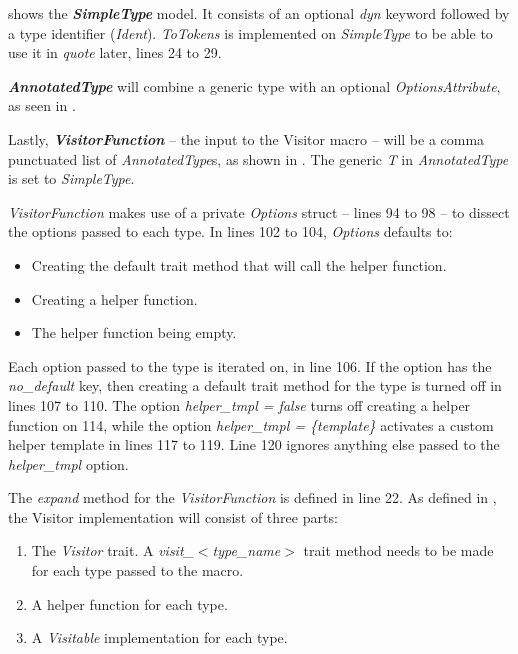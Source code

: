  shows the \textbf{\textit{SimpleType}} model.
It consists of an optional \textit{dyn} keyword followed by a type identifier (\textit{Ident}).
\textit{ToTokens} is implemented on \textit{SimpleType} to be able to use it in \textit{quote} later, lines 24 to 29.

\textbf{\textit{AnnotatedType}} will combine a generic type with an optional \textit{OptionsAttribute}, as seen in .


Lastly, \textbf{\textit{VisitorFunction}} -- the input to the Visitor macro -- will be a comma punctuated list of \textit{AnnotatedType}s, as shown in .
The generic \textit{T} in \textit{AnnotatedType} is set to \textit{SimpleType}.

\textit{VisitorFunction} makes use of a private \textit{Options} struct -- lines 94 to 98 -- to dissect the options passed to each type.
In lines 102 to 104, \textit{Options} defaults to:

\begin{itemize}
	\item Creating the default trait method that will call the helper function.
	\item Creating a helper function.
	\item The helper function being empty.
\end{itemize}

Each option passed to the type is iterated on, in line 106.
If the option has the \textit{no\_default} key, then creating a default trait method for the type is turned off in lines 107 to 110.
The option \textit{helper\_tmpl = false} turns off creating a helper function on 114, while the option \textit{helper\_tmpl = \{template\}} activates a custom helper template in lines 117 to 119.
Line 120 ignores anything else passed to the \textit{helper\_tmpl} option.

The \textit{expand} method for the \textit{VisitorFunction} is defined in line 22.
As defined in , the Visitor implementation will consist of three parts:

\begin{enumerate}
	\item The \textit{Visitor} trait.
	      A \textit{visit\_$<$type\_name$>$} trait method needs to be made for each type passed to the macro.
	\item A helper function for each type.
	\item A \textit{Visitable} implementation for each type.
\end{enumerate}

